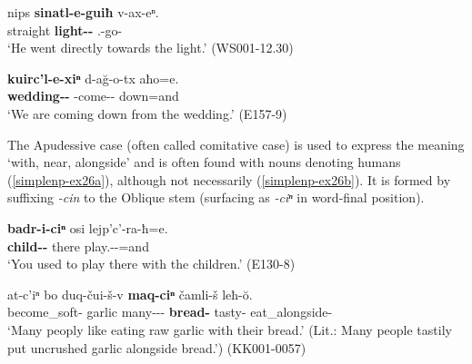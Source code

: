 \begin{exe}
	
		\ex\label{simplenp-ex36}
		\gll nips \textbf{sinatl-e-guiħ} v-ax-eⁿ. \\
		straight \textbf{light-{\Obl}-{\Apudlat}} {\M}.{\Sg}-go-{\Aor} \\
		\trans `He went directly towards the light.'
		\hfill (WS001-12.30)
	
\end{exe}



\begin{exe}
	
		\ex\label{simplenp-ex45}
		\gll \textbf{kuirc'l-e-xiⁿ} d-a\u{g}-o-tx aħo=e. \\
		\textbf{wedding-{\Obl}-{\Apudabl}} {\D}-come-{\Npst}-{\Fpl} down=and \\
		\trans `We are coming down from the wedding.'
		\hfill (E157-9)
	
\end{exe}


The Apudessive case (often called comitative case) is used to express the meaning `with, near, alongside' and is often found with nouns denoting humans (\ref{simplenp-ex26a}), although not necessarily (\ref{simplenp-ex26b}). It is formed by suffixing \textit{-cin} to the Oblique stem (surfacing as \textit{-ciⁿ} in word-final position).

\begin{exe}
	\ex\label{simplenp-ex26}
	\begin{xlist}
		
		
			\ex\label{simplenp-ex26a}
			\gll \textbf{badr-i-ciⁿ} osi lejp'c'-ra-ħ=e. \\
			\textbf{child-{\Pl}-{\Apudess}} there play.{\Ipfv}-{\Imprf}-{\Ssg}=and \\
			\trans `You used to play there with the children.'
			\hfill (E130-8)
		
		
		
			\ex\label{simplenp-ex26b}
			\gll at-c'iⁿ bo duq-čui-š-v \textbf{maq-ciⁿ} čamli-š leħ-\u{o}. \\
			become\_soft-{\Priv} garlic many-{\Obl}-{\Pl}-{\Erg} \textbf{bread-{\Apudess}} tasty-{\Adv} eat\_alongside-{\Npst} \\
			\trans `Many peoply like eating raw garlic with their bread.' (Lit.: Many people tastily put uncrushed garlic alongside bread.')
			\hfill (KK001-0057)
		
		
	\end{xlist}
\end{exe}


